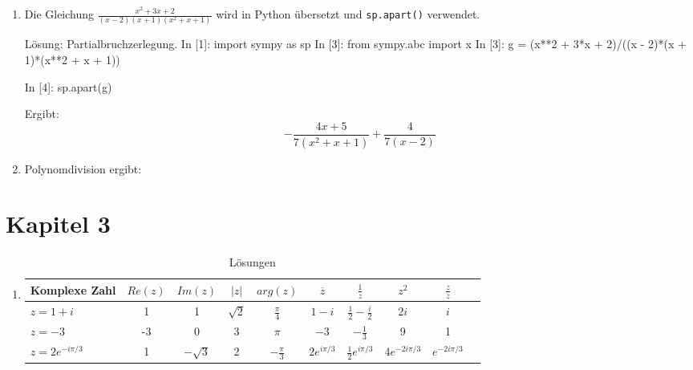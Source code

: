 \begin{enumerate}
\item Die Gleichung $ \frac{x^{2} + 3 x + 2}{\left(x - 2\right) \left(x + 1\right) \left(x^{2} + x + 1\right)}$ wird in Python übersetzt und \texttt{sp.apart()} verwendet.
\begin{python}{Lösung: Partialbruchzerlegung.}
In [1]: import sympy as sp
In [3]: from sympy.abc import x
In [3]: g = (x**2 + 3*x + 2)/((x - 2)*(x + 1)*(x**2 + x + 1))

In [4]: sp.apart(g)
\end{python}

Ergibt:
$$- \frac{4 x + 5}{7 \left(x^{2} + x + 1\right)} + \frac{4}{7 \left(x - 2\right)}$$

\item Polynomdivision ergibt: 


\end{enumerate}

\section{Kapitel 3}
\begin{enumerate}
\item 

\renewcommand{\arraystretch}{1.5}

\begin{table}[ht]
\centering
\begin{tabular}{|>{\raggedright}m{3cm}|c|c|c|c|c|c|c|c|c|}
\hline
\textbf{Komplexe Zahl} & $Re(z)$ & $Im(z)$ & $|z|$ & $arg(z)$ & $\overline{z}$ & $\frac{1}{z}$ & $z^2$ & $\frac{z}{\overline{z}}$ \\
\hline
$z = 1 + i$ & 1 & 1 & $\sqrt{2}$ & $\frac{\pi}{4}$ & $1 - i$ & $\frac{1}{2} - \frac{i}{2}$ & $2i$ & $i$ \\
\hline
$z = -3$ & -3 & 0 & 3 & $\pi$ & $-3$ & $-\frac{1}{3}$ & 9 & 1 \\
\hline
$z = 2e^{-i\pi/3}$ & 1 & $-\sqrt{3}$ & 2 & $-\frac{\pi}{3}$ & $2e^{i\pi/3}$  & $\frac{1}{2}e^{i\pi/3}$ & $4e^{-2i\pi/3}$ & $e^{-2i\pi/3}$ \\
\hline
\end{tabular}
\caption{Lösungen}
\end{table}

\end{enumerate}
